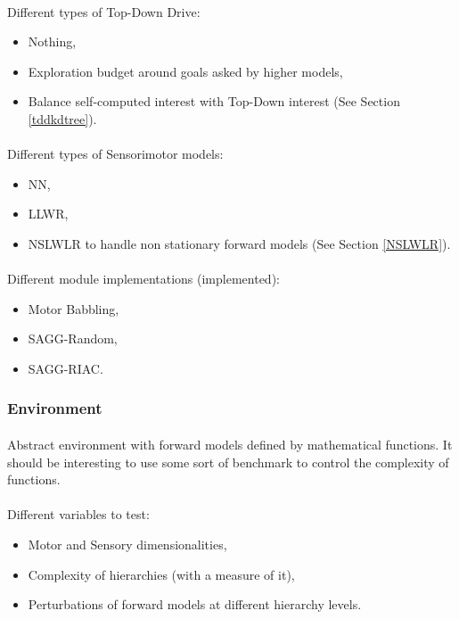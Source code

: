 \documentclass[12pt]{article}
\begin{document}
			\paragraph{}
			Different types of Top-Down Drive:
			\begin{itemize}
				\item Nothing,
				\item Exploration budget around goals asked by higher models,
				\item Balance self-computed interest with Top-Down interest (See Section \ref{tddkdtree}).
			\end{itemize}
			
			
			\paragraph{}
			Different types of Sensorimotor models:
			\begin{itemize}
				\item NN,
				\item LLWR,
				\item NSLWLR to handle non stationary forward models (See Section \ref{NSLWLR}).
			\end{itemize}
			
			\paragraph{}
			Different module implementations (implemented):
			\begin{itemize}
				\item Motor Babbling,
				\item SAGG-Random,
				\item SAGG-RIAC.
			\end{itemize}
		
		
		\subsubsection{Environment}
		
			\paragraph{}
			Abstract environment with forward models defined by mathematical functions. 
			It should be interesting to use some sort of benchmark to control the complexity of functions.
					
			\paragraph{}
			Different variables to test:
			\begin{itemize}
				\item Motor and Sensory dimensionalities,
				\item Complexity of hierarchies (with a measure of it),
				\item Perturbations of forward models at different hierarchy levels.
			\end{itemize}
		
\end{document}
